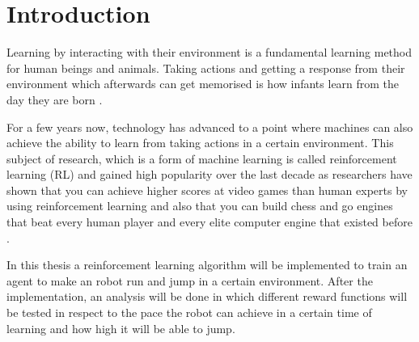 \chapter{Introduction}

Learning by interacting with their environment is a fundamental learning method for human beings and animals. Taking actions and getting a response from their environment which afterwards can get memorised is how infants learn from the day they are born \cite{sutton2018reinforcement}.

For a few years now, technology has advanced to a point where machines can also achieve the ability to learn from taking actions in a certain environment. This subject of research, which is a form of machine learning is called reinforcement learning (RL) and gained high popularity over the last decade as researchers have shown that you can achieve higher scores at video games \cite{mnih2013playing} than human experts by using reinforcement learning and also that you can build chess and go engines that beat every human player and every elite computer engine that existed before \cite{silver2018general}. 

In this thesis a reinforcement learning algorithm will be implemented to train an agent to make an robot run and jump in a certain environment. After the implementation, an analysis will be done in which different reward functions will be tested in respect to the pace the robot can achieve in a certain time of learning and how high it will be able to jump. 
